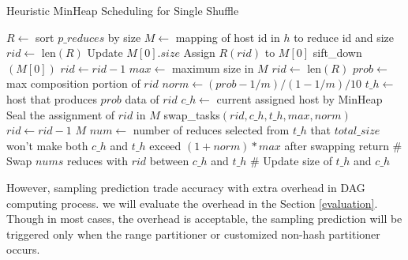 \begin{minipage}{\columnwidth}
\begin{algorithm}[H]
\caption{Heuristic MinHeap Scheduling for Single Shuffle}
\label{hminheap}
	\begin{algorithmic}[1]
	\small
		\State $R\gets$ sort $p\_reduces$ by size
		\State $M\gets$ mapping of host id in $h$ to reduce id and size
		\State $rid\gets$ len$\left(R\right)$
		\State Update $M\left[0\right].size$
		\State Assign $R\left(rid\right)$ to $M\left[0\right]$
		\State sift\_down$\left(M\left[0\right]\right)$
		\State
		\State $rid\gets rid-1$
		\EndWhile
		\State $max\gets$ maximum size in $M$
		\State $rid\gets$ len$\left(R\right)$
		\State $prob\gets$ max composition portion of $rid$
		\State $norm\gets \left(prob-1/m\right)/\left(1-1/m\right)/10$
		\State
		\State $t\_h\gets$ host that produces $prob$ data of $rid$
		\State $c\_h\gets$ current assigned host by MinHeap
			\State Seal the assignment of $rid$ in $M$
		\Else
			\State swap\_tasks$\left(rid, c\_h, t\_h, max, norm\right)$
		\EndIf
		\State $rid\gets rid-1$
		\EndWhile
		\Return $M$
	\EndProcedure
	\State $num\gets$ number of reduces
	\State selected from $t\_h$ that $total\_size$ won't
	\State make both $c\_h$ and $t\_h$ exceed $\left(1+norm\right)*max$
	\State after swapping
		\State return
	\Else
		\State \# Swap $nums$ reduces with $rid$ between $c\_h$ and $t\_h$
		\State \# Update size of $t\_h$ and $c\_h$
	\EndIf
	\EndProcedure
	\end{algorithmic}
\end{algorithm}
\end{minipage}

However, sampling prediction trade accuracy with extra overhead in DAG computing process. we will evaluate the overhead in the Section \ref{evaluation}. Though in most cases, the overhead is acceptable, the sampling prediction will be triggered only when the range partitioner or customized non-hash partitioner occurs.

